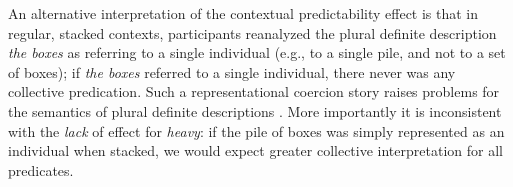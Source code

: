 \documentclass[linguex]{sp}
\begin{document}
An alternative interpretation of the contextual predictability effect is that in regular, stacked contexts, participants reanalyzed the plural definite description \emph{the boxes} as referring to a single individual (e.g., to a single pile, and not to a set of boxes); if \emph{the boxes} referred to a single individual, there never was any collective predication.
Such a representational coercion story raises problems for the semantics of plural definite descriptions \citep[for discussion, see ][]{link1983,landman1989,schwarzschild1996,link1998}. More importantly it is inconsistent with the \emph{lack} of effect for \emph{heavy}: if the pile of boxes was simply represented as an individual when stacked, we would expect greater collective interpretation for all predicates.


%
\end{document}
